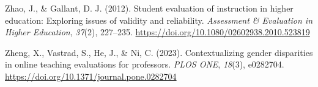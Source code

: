 \documentclass[
  man]{apa7}
\newlength{\cslhangindent}
\newlength{\cslentryspacingunit} %
\newenvironment{CSLReferences}[2] %
 {%
  \setlength{\parindent}{0pt}
  \ifodd #1
  \let\oldpar\par
  \def\par{\hangindent=\cslhangindent\oldpar}
  \fi
  \setlength{\parskip}{#2\cslentryspacingunit}
 }%
 {}
\begin{document}
\begin{CSLReferences}{1}{0}
\leavevmode{}%
Zhao, J., \& Gallant, D. J. (2012). Student evaluation of instruction in higher education: Exploring issues of validity and reliability. \emph{Assessment \& Evaluation in Higher Education}, \emph{37}(2), 227--235. \url{https://doi.org/10.1080/02602938.2010.523819}

\leavevmode{}%
Zheng, X., Vastrad, S., He, J., \& Ni, C. (2023). Contextualizing gender disparities in online teaching evaluations for professors. \emph{PLOS ONE}, \emph{18}(3), e0282704. \url{https://doi.org/10.1371/journal.pone.0282704}

\end{CSLReferences}
\end{document}
